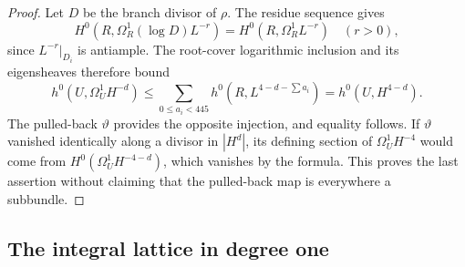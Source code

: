 \begin{proof}
Let $D$ be the branch divisor of $\rho$. The residue sequence gives
\[
 H^0(R,\Omega_R^1(\log D)L^{-r})=H^0(R,\Omega_R^1L^{-r})
 \quad(r>0),
\]
since $L^{-r}|_{D_i}$ is antiample. The root-cover logarithmic inclusion and its eigensheaves therefore bound
\[
 h^0(U,\Omega_U^1H^{-d})
 \le\sum_{0\le a_i<445}h^0(R,L^{4-d-\sum a_i})=h^0(U,H^{4-d}).
\]
The pulled-back $\vartheta$ provides the opposite injection, and equality follows. If $\vartheta$ vanished identically along a divisor in $|H^d|$, its defining section of $\Omega_U^1H^{-4}$ would come from $H^0(\Omega_U^1H^{-4-d})$, which vanishes by the formula. This proves the last assertion without claiming that the pulled-back map is everywhere a subbundle.
\end{proof}

\subsection{The integral lattice in degree one}

